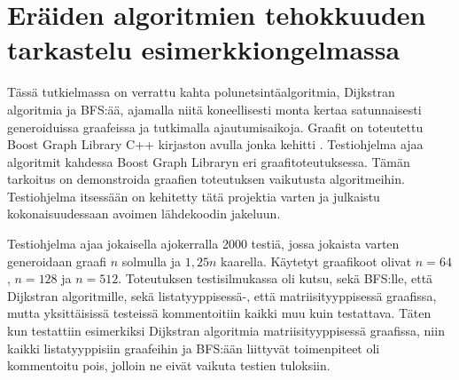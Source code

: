 \chapter{Eräiden algoritmien tehokkuuden tarkastelu esimerkkiongelmassa}\label{benchmarking}

Tässä tutkielmassa on verrattu kahta polunetsintäalgoritmia, Dijkstran 
algoritmia ja BFS:ää, ajamalla niitä koneellisesti monta kertaa satunnaisesti 
generoiduissa graafeissa ja tutkimalla ajautumisaikoja. Graafit on toteutettu
Boost Graph Library C++ kirjaston avulla jonka kehitti \textcite{bgl} . 
Testiohjelma ajaa algoritmit kahdessa Boost Graph Libraryn eri 
graafitoteutuksessa. Tämän tarkoitus on demonstroida graafien toteutuksen 
vaikutusta algoritmeihin. Testiohjelma itsessään on kehitetty tätä 
projektia varten ja julkaistu kokonaisuudessaan avoimen lähdekoodin jakeluun.
\cite{gt2} \par
	Testiohjelma ajaa jokaisella ajokerralla 2000 testiä, jossa jokaista 
varten generoidaan graafi $n$ solmulla ja $1,25n$ kaarella. Käytetyt 
graafikoot olivat $n=64$, $n=128$ ja $n=512$. Toteutuksen testisilmukassa 
oli kutsu, sekä BFS:lle, että Dijkstran algoritmille, sekä listatyyppisessä-, 
että matriisityyppisessä graafissa, mutta yksittäisissä testeissä 
kommentoitiin kaikki muu kuin testattava. Täten kun testattiin esimerkiksi 
Dijkstran algoritmia matriisityyppisessä graafissa, niin kaikki 
listatyyppisiin graafeihin ja BFS:ään liittyvät toimenpiteet oli kommentoitu 
pois, jolloin ne eivät vaikuta testien tuloksiin.\cite{gt2} \par

